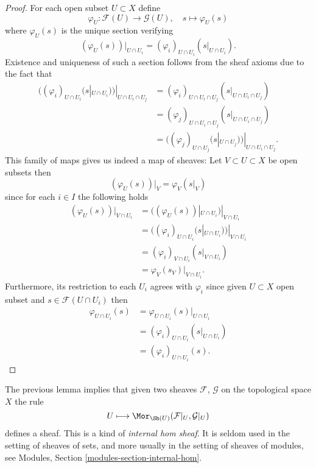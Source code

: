\begin{proof}
For each open subset $U \subset X$ define
$$
\varphi_U : \mathcal{F}(U) \to \mathcal{G}(U), \quad
s \mapsto \varphi_U(s)
$$
where $\varphi_U(s)$ is the unique section verifying
$$
(\varphi_U(s))|_{U \cap U_i}
= (\varphi_i)_{U \cap U_i}(s|_{U \cap U_i}).
$$
Existence and uniqueness of such a section
follows from the sheaf axioms
due to the fact that
\begin{align*}
((\varphi_i)_{U \cap U_i}(s|_{U \cap U_i}))|_{U \cap U_i \cap U_j}
&= (\varphi_i)_{U \cap U_i \cap U_j}(s|_{U \cap U_i \cap U_j})\\
&= (\varphi_j)_{U \cap U_i \cap U_j}(s|_{U \cap U_i \cap U_j})\\
&= ((\varphi_j)_{U \cap U_j}(s|_{U \cap U_j}))|_{U \cap U_i \cap U_j}.
\end{align*}
This family of maps gives us indeed a map of sheaves:
Let $V \subset U \subset X$ be open subsets then
$$
(\varphi_U(s))|_V
= \varphi_V(s|_V)
$$
since for each $i \in I$ the following holds
\begin{align*}
(\varphi_U(s))|_{V \cap U_i}
&= ((\varphi_U(s))|_{U \cap U_i})|_{V \cap U_i}\\
&= ((\varphi_i)_{U \cap U_i}(s|_{U \cap U_i}))|_{V \cap U_i}\\
&= (\varphi_i)_{V \cap U_i}(s|_{V \cap U_i})\\
&= \varphi_V(s_{V})|_{V \cap U_i}.
\end{align*}
Furthermore,
its restriction to each $U_i$ agrees with $\varphi_i$
since given $U \subset X$ open subset
and $s \in \mathcal{F}(U \cap U_i)$ then
\begin{align*}
\varphi_{U \cap U_i}(s)
&= \varphi_{U \cap U_i}(s)|_{U \cap U_i}\\
&= (\varphi_i)_{U \cap U_i}(s|_{U \cap U_i})\\
&= (\varphi_i)_{U \cap U_i}(s).
\end{align*}
\end{proof}

\noindent
The previous lemma implies that given two sheaves $\mathcal{F}$,
$\mathcal{G}$ on the topological space $X$ the rule
$$
U \longmapsto
\Mor_{\Sh(U)}(
\mathcal{F}|_U, \mathcal{G}|_U)
$$
defines a sheaf. This is a kind of {\it internal hom sheaf}. It is
seldom used in the setting of sheaves of sets, and more usually
in the setting of sheaves of modules, see
Modules, Section \ref{modules-section-internal-hom}.

